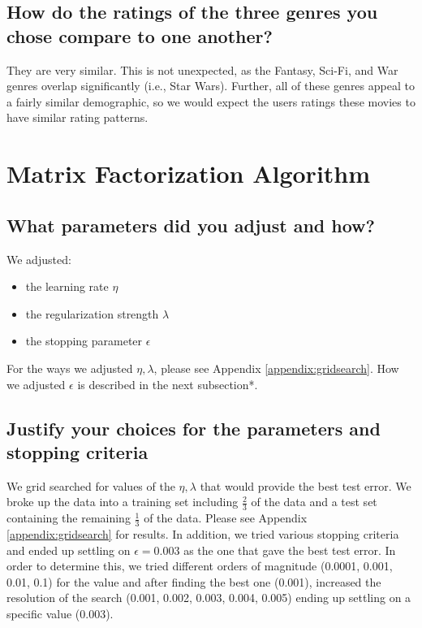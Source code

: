 \subsection*{How do the ratings of the three genres you chose compare to one another?}
They are very similar. This is not unexpected, as the Fantasy, Sci-Fi, and War genres overlap significantly (i.e., Star Wars). Further, all of these genres appeal to a fairly similar demographic, so we would expect the users ratings these movies to have similar rating patterns.
\pagebreak

\section{Matrix Factorization Algorithm}
\medskip
\subsection*{What parameters did you adjust and how?}
\noindent We adjusted:
\begin{itemize}
  \item the learning rate $\eta$
  \item the regularization strength $\lambda$
  \item the stopping parameter $\epsilon$
\end{itemize}
For the ways we adjusted $\eta,\lambda$, please see Appendix \ref{appendix:gridsearch}. How we adjusted $\epsilon$ is described in the next subsection*.

\subsection*{Justify your choices for the parameters and stopping criteria}
We grid searched for values of the $\eta,\lambda$ that would provide the best test error. We broke up the data into a training set including $\frac{2}{3}$ of the data and a test set containing the remaining $\frac{1}{3}$ of the data. Please see Appendix \ref{appendix:gridsearch} for results. In addition, we tried various stopping criteria and ended up settling on $\epsilon=0.003$ as the one that gave the best test error. In order to determine this, we tried different orders of magnitude (0.0001, 0.001, 0.01, 0.1) for the value and after finding the best one (0.001), increased the resolution of the search (0.001, 0.002, 0.003, 0.004, 0.005) ending up settling on a specific value (0.003). 

